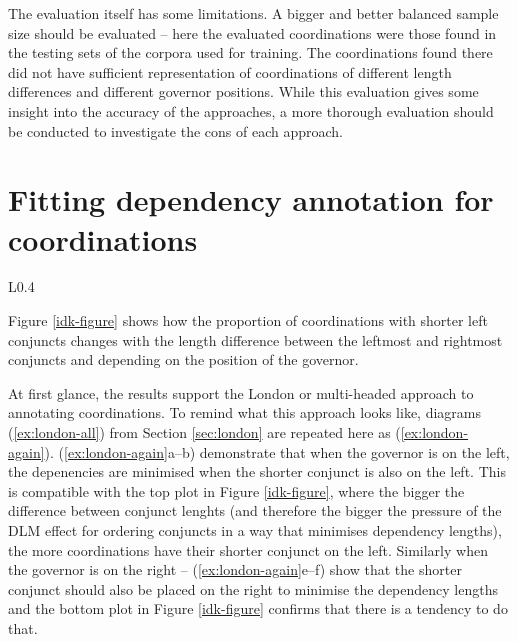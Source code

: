 The evaluation itself has some limitations. A bigger and better balanced sample size should be evaluated -- here the evaluated coordinations were those found in the testing sets of the corpora used for training. The coordinations found there did not have sufficient representation of coordinations of different length differences and different governor positions. While this evaluation gives some insight into the accuracy of the approaches, a more thorough evaluation should be conducted to investigate the cons of each approach.

\section{Fitting dependency annotation for coordinations}

\begin{wrapfigure}{L}{0.4\textwidth}
\caption{Modelled proportions of coordinations with shorter left conjunct depending on the length difference between the conjuncts, data according to
the SUD-trained model with lengths measured in words.}\label{idk-figure}
\end{wrapfigure}



Figure \ref{idk-figure} shows how the proportion of coordinations with shorter left conjuncts changes with the length difference between the leftmost and rightmost conjuncts and depending on the position of the governor. 

At first glance, the results support the London or multi-headed approach to annotating coordinations. To remind what this approach looks like, diagrams (\ref{ex:london-all}) from Section \ref{sec:london} are repeated here as (\ref{ex:london-again}). (\ref{ex:london-again}a--b) demonstrate that when the governor is on the left, the depenencies are minimised when the shorter conjunct is also on the left. This is compatible with the top plot in Figure \ref{idk-figure}, where the bigger the difference between conjunct lenghts (and therefore the bigger the pressure of the DLM effect for ordering conjuncts in a way that minimises dependency lengths), the more coordinations have their shorter conjunct on the left. Similarly when the governor is on the right -- (\ref{ex:london-again}e--f) show that the shorter conjunct should also be placed on the right to minimise the dependency lengths and the bottom plot in Figure \ref{idk-figure} confirms that there is a tendency to do that. 

